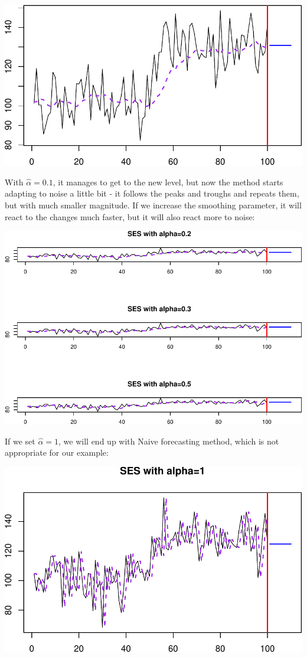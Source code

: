 \documentclass[
]{book}
\theoremstyle{definition}
\theoremstyle{definition}
\theoremstyle{definition}
\theoremstyle{definition}
\theoremstyle{remark}
\begin{document}
\includegraphics{adam_files/figure-latex/SESExample2-1.pdf}

With \(\hat{\alpha}=0.1\), it manages to get to the new level, but now the method starts adapting to noise a little bit - it follows the peaks and troughs and repeats them, but with much smaller magnitude. If we increase the smoothing parameter, it will react to the changes much faster, but it will also react more to noise:

\includegraphics{adam_files/figure-latex/unnamed-chunk-20-1.pdf}

If we set \(\hat{\alpha}=1\), we will end up with Naive forecasting method, which is not appropriate for our example:

\includegraphics{adam_files/figure-latex/unnamed-chunk-21-1.pdf}
\end{document}
